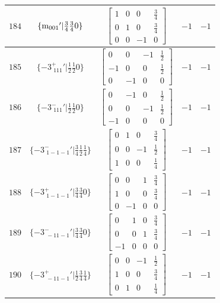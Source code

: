 \documentclass[fleqn,8pt]{jsarticle}
\begin{document}
\begin{longtable}{ccccc}
$ 184 $ & $ \{{\rm m}_{001}{}'|\frac{3}{4} \frac{3}{4} 0\} $ & $ \begin{bmatrix} 1 & 0 & 0 & \frac{3}{4} \\ 0 & 1 & 0 & \frac{3}{4} \\ 0 & 0 & -1 & 0 \end{bmatrix} $ & $ -1 $ & $ -1 $ \\ \hline
$ 185 $ & $ \{-3^{+}_{\,\,111}{}'|\frac{1}{2} \frac{1}{2} 0\} $ & $ \begin{bmatrix} 0 & 0 & -1 & \frac{1}{2} \\ -1 & 0 & 0 & \frac{1}{2} \\ 0 & -1 & 0 & 0 \end{bmatrix} $ & $ -1 $ & $ -1 $ \\ \hline
$ 186 $ & $ \{-3^{-}_{\,\,111}{}'|\frac{1}{2} \frac{1}{2} 0\} $ & $ \begin{bmatrix} 0 & -1 & 0 & \frac{1}{2} \\ 0 & 0 & -1 & \frac{1}{2} \\ -1 & 0 & 0 & 0 \end{bmatrix} $ & $ -1 $ & $ -1 $ \\ \hline
$ 187 $ & $ \{-3^{-}_{\,\,1-1-1}{}'|\frac{3}{4} \frac{1}{2} \frac{1}{4}\} $ & $ \begin{bmatrix} 0 & 1 & 0 & \frac{3}{4} \\ 0 & 0 & -1 & \frac{1}{2} \\ 1 & 0 & 0 & \frac{1}{4} \end{bmatrix} $ & $ -1 $ & $ -1 $ \\ \hline
$ 188 $ & $ \{-3^{+}_{\,\,1-1-1}{}'|\frac{3}{4} \frac{3}{4} 0\} $ & $ \begin{bmatrix} 0 & 0 & 1 & \frac{3}{4} \\ 1 & 0 & 0 & \frac{3}{4} \\ 0 & -1 & 0 & 0 \end{bmatrix} $ & $ -1 $ & $ -1 $ \\ \hline
$ 189 $ & $ \{-3^{-}_{\,\,-11-1}{}'|\frac{3}{4} \frac{3}{4} 0\} $ & $ \begin{bmatrix} 0 & 1 & 0 & \frac{3}{4} \\ 0 & 0 & 1 & \frac{3}{4} \\ -1 & 0 & 0 & 0 \end{bmatrix} $ & $ -1 $ & $ -1 $ \\ \hline
$ 190 $ & $ \{-3^{+}_{\,\,-11-1}{}'|\frac{1}{2} \frac{3}{4} \frac{1}{4}\} $ & $ \begin{bmatrix} 0 & 0 & -1 & \frac{1}{2} \\ 1 & 0 & 0 & \frac{3}{4} \\ 0 & 1 & 0 & \frac{1}{4} \end{bmatrix} $ & $ -1 $ & $ -1 $ \\ \hline

\end{longtable}
\end{document}
